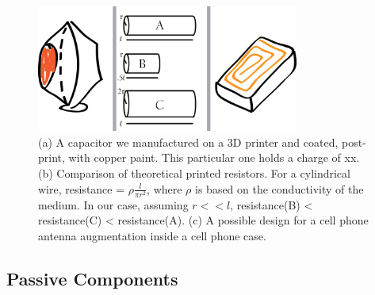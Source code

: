 
\begin{figure}[h]
\centering
    \includegraphics[width=3.4in]{figures/electronics.png}
\caption{(a) A capacitor we manufactured on a 3D printer and coated, post-print, with copper paint.  This particular one holds a charge of xx.  (b) Comparison of theoretical printed resistors.  For a cylindrical wire, resistance = $\rho\frac{l}{\pi r^2}$, where $\rho$ is based on the conductivity of the medium.  In our case, assuming $ r << l$, resistance(B) < resistance(C) < resistance(A).  (c) A possible design for a cell phone antenna augmentation inside a cell phone case. }
\label{fig:electronics}
\end{figure}

\subsection{Passive Components}

